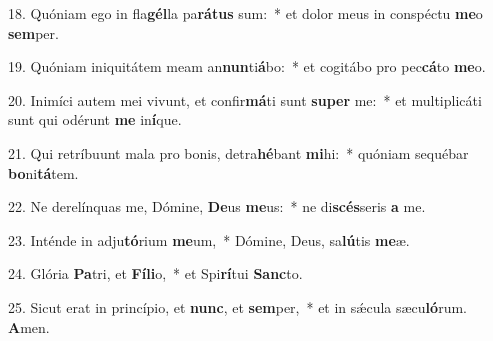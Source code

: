 18. Quóniam ego in fla\textbf{gél}la pa\textbf{rá}\textbf{tus} sum:~*  et dolor meus in conspéctu \textbf{me}o \textbf{sem}per.\

19. Quóniam iniquitátem meam an\textbf{nun}ti\textbf{á}bo:~*  et cogitábo pro pec\textbf{cá}to \textbf{me}o.\

20. Inimíci autem mei vivunt, et confir\textbf{má}ti sunt \textbf{su}\textbf{per} me:~*  et multiplicáti sunt qui odérunt \textbf{me} in\textbf{í}que.\

21. Qui retríbuunt mala pro bonis, detra\textbf{hé}bant \textbf{mi}hi:~*  quóniam sequébar \textbf{bo}ni\textbf{tá}tem.\

22. Ne derelínquas me, Dómine, \textbf{De}us \textbf{me}us:~*  ne di\textbf{scés}seris \textbf{a} me.\

23. Inténde in adju\textbf{tó}rium \textbf{me}um,~*  Dómine, Deus, sa\textbf{lú}tis \textbf{me}æ.\

24. Glória \textbf{Pa}tri, et \textbf{Fí}\textbf{li}o,~*  et Spi\textbf{rí}tui \textbf{Sanc}to.\

25. Sicut erat in princípio, et \textbf{nunc}, et \textbf{sem}per,~*  et in sǽcula sæcu\textbf{ló}rum. \textbf{A}men.\

